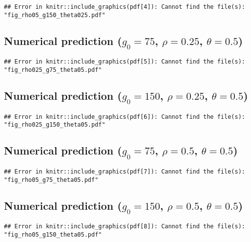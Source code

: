 \begin{verbatim}
## Error in knitr::include_graphics(pdf[4]): Cannot find the file(s): "fig_rho05_g150_theta025.pdf"
\end{verbatim}

\newpage

\subsection{\texorpdfstring{Numerical prediction (\(g_0=75\),
\(\rho=0.25\),
\(\theta=0.5\))}{Numerical prediction (g\_0=75, \textbackslash rho=0.25, \textbackslash theta=0.5)}}\label{numerical-prediction-g_075-rho0.25-theta0.5}

\begin{verbatim}
## Error in knitr::include_graphics(pdf[5]): Cannot find the file(s): "fig_rho025_g75_theta05.pdf"
\end{verbatim}

\newpage

\subsection{\texorpdfstring{Numerical prediction (\(g_0=150\),
\(\rho=0.25\),
\(\theta=0.5\))}{Numerical prediction (g\_0=150, \textbackslash rho=0.25, \textbackslash theta=0.5)}}\label{numerical-prediction-g_0150-rho0.25-theta0.5}

\begin{verbatim}
## Error in knitr::include_graphics(pdf[6]): Cannot find the file(s): "fig_rho025_g150_theta05.pdf"
\end{verbatim}

\newpage

\subsection{\texorpdfstring{Numerical prediction (\(g_0=75\),
\(\rho=0.5\),
\(\theta=0.5\))}{Numerical prediction (g\_0=75, \textbackslash rho=0.5, \textbackslash theta=0.5)}}\label{numerical-prediction-g_075-rho0.5-theta0.5}

\begin{verbatim}
## Error in knitr::include_graphics(pdf[7]): Cannot find the file(s): "fig_rho05_g75_theta05.pdf"
\end{verbatim}

\newpage

\subsection{\texorpdfstring{Numerical prediction (\(g_0=150\),
\(\rho=0.5\),
\(\theta=0.5\))}{Numerical prediction (g\_0=150, \textbackslash rho=0.5, \textbackslash theta=0.5)}}\label{numerical-prediction-g_0150-rho0.5-theta0.5}

\begin{verbatim}
## Error in knitr::include_graphics(pdf[8]): Cannot find the file(s): "fig_rho05_g150_theta05.pdf"
\end{verbatim}

\newpage
